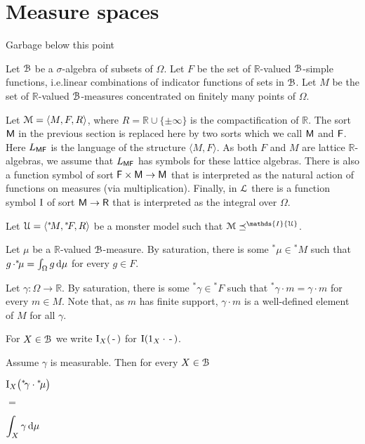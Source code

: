\documentclass[11pt,oneside]{amsart}
\begin{document}
\section{Measure spaces}

\noindent\llap{\textcolor{red}{\Large\dangersign}\kern1ex}\ignorespaces
Garbage below this point

Let ${\EuScript B}$ be a $\sigma$-algebra of subsets of $\Omega$.
Let $F$ be the set of $\mathds{R}$-valued ${\EuScript B}$-simple functions, i.e.\@ linear combinations of indicator functions of sets in ${\EuScript B}$.
Let $M$ be the set of $\mathds{R}$-valued ${\EuScript B}$-measures concentrated on finitely many points of $\Omega$.

Let ${\EuScript M}=\langle M,F,R\rangle$, where $R=\mathds{R}\cup\{\pm\infty\}$ is the compactification of $\mathds{R}$.
The sort ${\sf M}$ in the previous section is replaced here by two sorts which we call ${\sf M}$ and ${\sf F}$.
Here $L_{\sf MF}$ is the language of the structure $\langle M,F\rangle$.
As both $F$ and $M$ are lattice $\mathds{R}$-algebras, we assume that $L_{\sf MF}$ has symbols for these lattice algebras.
There is also a function symbol of sort ${\sf F}\times{\sf M}\to{\sf M}$ that is interpreted as the natural action of functions on measures (via multiplication).
Finally, in ${\EuScript L}$ there is a function symbol ${\rm I}$ of sort ${\sf M}\to{\sf R}$ that is interpreted as the integral over $\Omega$.

Let ${\EuScript U}=\langle {}^*\!M,{}^*\!F,R\rangle$ be a monster model such that ${\EuScript M}\preceq^\mathds{I}{\EuScript U}$.

\def\ceq#1#2#3{\parbox[t]{25ex}{$\displaystyle #1$}\parbox{5ex}{\hfil $#2$}{$\displaystyle #3$}}

Let $\mu$ be a $\mathds{R}$-valued ${\EuScript B}$-measure.
By saturation, there is some ${}^*\!\mu\in{}^*\!M$ such that $g\,{\cdot}{}^*\!\mu=\int_\Omega g\,{\rm d}\mu$ for every $g\in F$.

 Let $\gamma:\Omega\to\mathds{R}$. 
 By saturation, there is some ${}^*\!\gamma\in{}^*\!F$ such that ${}^*\!\gamma\mathbin\cdot m=\gamma\mathbin\cdot m$ for every $m\in M$. 
 Note that, as $m$ has finite support, $\gamma\mathbin\cdot m$ is a well-defined element of $M$ for all $\gamma$.

 For $X\in{\EuScript B}$ we write ${\rm I}_X(\,\mbox{-}\,)$ for ${\rm I}(1_X\cdot\,\mbox{-}\,)$.

\begin{lemma}
  Assume $\gamma$ is measurable.
  Then for every $X\in{\EuScript B}$

  \ceq{\hfill {\rm I}_X\big({}^*\!\gamma\cdot{}^*\!\mu\big)}{=}{\int_X \gamma\,{\rm d}\mu}
  
  
\end{lemma}
\end{document}
